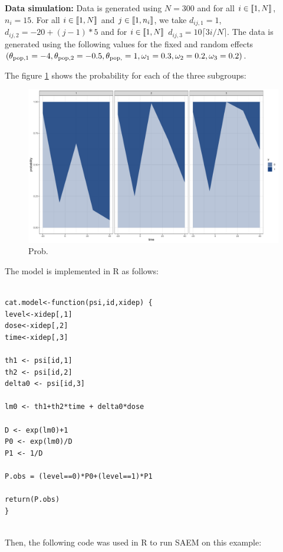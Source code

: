 \textbf{Data simulation:} Data is generated using $N=300$ and for all $i \in \llbracket1,N\rrbracket$, $n_i=15$. For all $i \in \llbracket1,N\rrbracket$ and $j \in \llbracket1, n_i \rrbracket$, we take $d_{ij,1}= 1$,  $d_{ij,2} = -20 + (j-1)*5$ and for
$i \in \llbracket1,N\rrbracket$ $d_{ij,3} = 10 \lceil 3i/N \rceil$.
The data is generated using the following values for the fixed and random effects $( \theta_{\rm pop,1} =-4, \theta_{\rm pop,2}= -0.5, \theta_{\rm pop,}=1,  \omega_1=0.3, \omega_2=0.2, \omega_3=0.2)$.

The figure \ref{fig:prob} shows the probability for each of the three subgroups:
\begin{figure}[thp]
\begin{center}
\includegraphics[width=\textwidth]{images/prob_class.pdf}
\caption{Prob.}
\label{fig:prob}
\end{center}
\end{figure}


The model is implemented in R as follows:

\begin{lstlisting}

cat.model<-function(psi,id,xidep) {
level<-xidep[,1]
dose<-xidep[,2]
time<-xidep[,3]

th1 <- psi[id,1]
th2 <- psi[id,2]
delta0 <- psi[id,3]

lm0 <- th1+th2*time + delta0*dose

D <- exp(lm0)+1
P0 <- exp(lm0)/D
P1 <- 1/D

P.obs = (level==0)*P0+(level==1)*P1

return(P.obs)
}


\end{lstlisting}
Then, the following code was used in R to run SAEM on this example:

